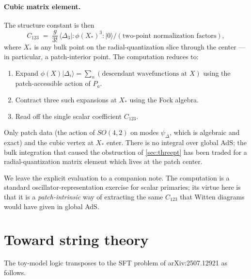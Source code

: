 \documentclass[11pt]{article}
\begin{document}
\paragraph{Cubic matrix element.} The structure constant is then
\begin{equation}
    C_{123} \;=\; \frac{g}{3!}\,\bigl\langle \Delta_3\bigl|:\phi(X_*)^3:\bigr|0\bigr\rangle\big/(\text{two-point normalization factors}),
\end{equation}
where $X_*$ is any bulk point on the radial-quantization slice through the center --- in particular, a patch-interior point. The computation reduces to:
\begin{enumerate}
\item Expand $\phi(X)|\Delta_i\rangle = \sum_n (\text{descendant wavefunctions at }X)$ using the patch-accessible action of $P_a$.
\item Contract three such expansions at $X_*$ using the Fock algebra.
\item Read off the single scalar coefficient $C_{123}$.
\end{enumerate}
Only patch data (the action of $SO(4,2)$ on modes $\psi_\Delta$, which is algebraic and exact) and the cubic vertex at $X_*$ enter. There is no integral over global AdS; the bulk integration that caused the obstruction of \cref{sec:threept} has been traded for a radial-quantization matrix element which lives at the patch center.

We leave the explicit evaluation to a companion note. The computation is a standard oscillator-representation exercise for scalar primaries; its virtue here is that it is a \emph{patch-intrinsic} way of extracting the same $C_{123}$ that Witten diagrams would have given in global AdS.

\section{Toward string theory}\label{sec:string}

The toy-model logic transposes to the SFT problem of arXiv:2507.12921 as follows.
\end{document}
